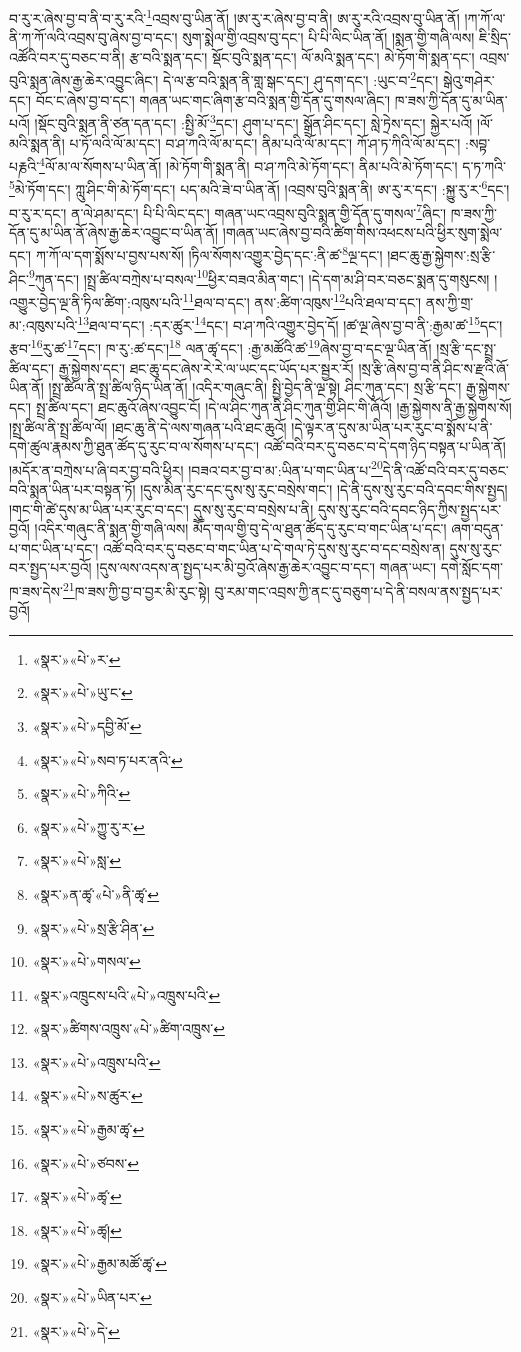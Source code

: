 བ་རུ་ར་ཞེས་བྱ་བ་ནི་བ་རུ་རའི་\footnote{«སྣར་»«པེ་»ར་}འབྲས་བུ་ཡིན་ནོ། །ཨ་རུ་ར་ཞེས་བྱ་བ་ནི། ཨ་རུ་རའི་འབྲས་བུ་ཡིན་ནོ། །ཀ་ཀོ་ལ་ནི་ཀ་ཀོ་ལའི་འབྲས་བུ་ཞེས་བྱ་བ་དང་། སུག་སྨེལ་གྱི་འབྲས་བུ་དང་། པི་པི་ལིང་ཡིན་ནོ། །སྨན་གྱི་གཞི་ལས། ཇི་སྲིད་འཚོའི་བར་དུ་བཅང་བ་ནི། རྩ་བའི་སྨན་དང་། སྡོང་བུའི་སྨན་དང་། ལོ་མའི་སྨན་དང་། མེ་ཏོག་གི་སྨན་དང་། འབྲས་བུའི་སྨན་ཞེས་རྒྱ་ཆེར་འབྱུང་ཞིང་། དེ་ལ་རྩ་བའི་སྨན་ནི་གླ་སྒང་དང་། ཤུ་དག་དང་། :ཡུང་བ་\footnote{«སྣར་»«པེ་»ཡུ་ང་}དང་། སྒེའུ་གཤེར་དང་། བོང་ང་ཞེས་བྱ་བ་དང་། གཞན་ཡང་གང་ཞིག་རྩ་བའི་སྨན་གྱི་དོན་དུ་གསལ་ཞིང་། ཁ་ཟས་ཀྱི་དོན་དུ་མ་ཡིན་པའོ། །སྡོང་བུའི་སྨན་ནི་ཙན་དན་དང་། :སྤྱི་མོ་\footnote{«སྣར་»«པེ་»དབྱི་མོ་}དང་། ཤུག་པ་དང་། སྒྲོན་ཤིང་དང་། སླེ་ཏྲེས་དང་། སྐྱེར་པའོ། །ལོ་མའི་སྨན་ནི། པ་ཏོ་ལའི་ལོ་མ་དང་། བ་ཤ་ཀའི་ལོ་མ་དང་། ནིམ་པའི་ལོ་མ་དང་། ཀོ་ཤ་ཏ་ཀིའི་ལོ་མ་དང་། :སབྟ་པརྞའི་\footnote{«སྣར་»«པེ་»སབ་ཏ་པར་ནའི་}ལོ་མ་ལ་སོགས་པ་ཡིན་ནོ། །མེ་ཏོག་གི་སྨན་ནི། བ་ཤ་ཀའི་མེ་ཏོག་དང་། ནིམ་པའི་མེ་ཏོག་དང་། ད་ཏ་ཀའི་\footnote{«སྣར་»«པེ་»ཀིའི་}མེ་ཏོག་དང་། ཀླུ་ཤིང་གི་མེ་ཏོག་དང་། པད་མའི་ཟེ་བ་ཡིན་ནོ། །འབྲས་བུའི་སྨན་ནི། ཨ་རུ་ར་དང་། :སྐྱུ་རུ་ར་\footnote{«སྣར་»«པེ་»ཀྱུ་རུ་ར་}དང་། བ་རུ་ར་དང་། ན་ལེ་ཤམ་དང་། པི་པི་ལིང་དང་། གཞན་ཡང་འབྲས་བུའི་སྨན་གྱི་དོན་དུ་གསལ་\footnote{«སྣར་»«པེ་»སླ་}ཞིང་། ཁ་ཟས་ཀྱི་དོན་དུ་མ་ཡིན་ནོ་ཞེས་རྒྱ་ཆེར་འབྱུང་བ་ཡིན་ནོ། །གཞན་ཡང་ཞེས་བྱ་བའི་ཚིག་གིས་འཕངས་པའི་ཕྱིར་སུག་སྨེལ་དང་། ཀ་ཀོ་ལ་དག་སྨོས་པ་བྱས་པས་སོ། །ཏིལ་སོགས་འགྱུར་བྱེད་དང་:ནི་ཚ་\footnote{«སྣར་»ན་ཚྭ་«པེ་»ནི་ཚྭ་}ལྔ་དང་། །ཐང་ཆུ་རྒྱ་སྐྱེགས་:སྲ་རྩི་ཤིང་\footnote{«སྣར་»«པེ་»སྲ་རྩི་ཤིན་}ཀུན་དང་། །སྤྲ་ཚིལ་བཀྲེས་པ་བསལ་\footnote{«སྣར་»«པེ་»གསལ་}ཕྱིར་བཟའ་མིན་གང་། །དེ་དག་མ་ཤི་བར་བཅང་སྨན་དུ་གསུངས། །འགྱུར་བྱེད་ལྔ་ནི་ཏིལ་ཚིག་:འཁུས་པའི་\footnote{«སྣར་»འཁྲུངས་པའི་«པེ་»འཁྲུས་པའི་}ཐལ་བ་དང་། ནས་:ཚིག་འཁུས་\footnote{«སྣར་»ཚིགས་འཁྲུས་«པེ་»ཚིག་འཁྲུས་}པའི་ཐལ་བ་དང་། ནས་ཀྱི་གྲ་མ་:འཁུས་པའི་\footnote{«སྣར་»«པེ་»འཁྲུས་པའི་}ཐལ་བ་དང་། :དར་ཚུར་\footnote{«སྣར་»«པེ་»ས་ཚུར་}དང་། བ་ཤ་ཀའི་འགྱུར་བྱེད་དོ། །ཚ་ལྔ་ཞེས་བྱ་བ་ནི་:རྒྱམ་ཚ་\footnote{«སྣར་»«པེ་»རྒྱམ་ཚྭ་}དང་། རྩབ་\footnote{«སྣར་»«པེ་»ཙབས་}རུ་ཚ་\footnote{«སྣར་»«པེ་»ཚྭ་}དང་། ཁ་རུ་:ཚ་དང་།\footnote{«སྣར་»«པེ་»ཚྭ།} ལན་ཚྭ་དང་། :རྒྱ་མཚོའི་ཚ་\footnote{«སྣར་»«པེ་»རྒྱམ་མཚོ་ཚྭ་}ཞེས་བྱ་བ་དང་ལྔ་ཡིན་ནོ། །སྲ་རྩི་དང་སྤྲ་ཚིལ་དང་། རྒྱ་སྐྱེགས་དང་། ཐང་ཆུ་དང་ཞེས་རེ་རེ་ལ་ཡང་དང་ཡོད་པར་སྦྱར་རོ། །སྲ་རྩི་ཞེས་བྱ་བ་ནི་ཤིང་ས་རྫའི་ཞོ་ཡིན་ནོ། །སྤྲ་ཚིལ་ནི་སྤྲ་ཚིལ་ཉིད་ཡིན་ནོ། །འདིར་གཞུང་ནི། སྤྱི་བྱེད་ནི་ལྔ་སྟེ། ཤིང་ཀུན་དང་། སྲ་རྩི་དང་། རྒྱ་སྐྱེགས་དང་། སྤྲ་ཚིལ་དང་། ཐང་ཆུའོ་ཞེས་འབྱུང་ངོ། །དེ་ལ་ཤིང་ཀུན་ནི་ཤིང་ཀུན་གྱི་ཤིང་གི་ཞོའོ། །རྒྱ་སྐྱེགས་ནི་རྒྱ་སྐྱེགས་སོ། །སྤྲ་ཚིལ་ནི་སྤྲ་ཚིལ་ལོ། །ཐང་ཆུ་ནི་དེ་ལས་གཞན་པའི་ཐང་ཆུའོ། །དེ་ལྟར་ན་དུས་མ་ཡིན་པར་རུང་བ་སྨོས་པ་ནི་དགེ་ཚུལ་རྣམས་ཀྱི་ཐུན་ཚོད་དུ་རུང་བ་ལ་སོགས་པ་དང་། འཚོ་བའི་བར་དུ་བཅང་བ་དེ་དག་ཉིད་བསྟན་པ་ཡིན་ནོ། །མདོར་ན་བཀྲེས་པ་ཞི་བར་བྱ་བའི་ཕྱིར། །བཟའ་བར་བྱ་བ་མ་:ཡིན་པ་གང་ཡིན་པ་\footnote{«སྣར་»«པེ་»ཡིན་པར་}དེ་ནི་འཚོ་བའི་བར་དུ་བཅང་བའི་སྨན་ཡིན་པར་བསྟན་ཏོ། །དུས་མིན་རུང་དང་དུས་སུ་རུང་བསྲེས་གང་། །དེ་ནི་དུས་སུ་རུང་བའི་དབང་གིས་སྤྱད། །གང་གི་ཚེ་དུས་མ་ཡིན་པར་རུང་བ་དང་། དུས་སུ་རུང་བ་བསྲེས་པ་ནི། དུས་སུ་རུང་བའི་དབང་ཉིད་ཀྱིས་སྤྱད་པར་བྱའོ། །འདིར་གཞུང་ནི་སྨན་གྱི་གཞི་ལས། མཽད་གལ་གྱི་བུ་དེ་ལ་ཐུན་ཚོད་དུ་རུང་བ་གང་ཡིན་པ་དང་། ཞག་བདུན་པ་གང་ཡིན་པ་དང་། འཚོ་བའི་བར་དུ་བཅང་བ་གང་ཡིན་པ་དེ་གལ་ཏེ་དུས་སུ་རུང་བ་དང་བསྲེས་ན། དུས་སུ་རུང་བར་སྤྱད་པར་བྱའོ། །དུས་ལས་འདས་ན་སྤྱད་པར་མི་བྱའོ་ཞེས་རྒྱ་ཆེར་འབྱུང་བ་དང་། གཞན་ཡང་། དགེ་སློང་དག་ཁ་ཟས་དེས་\footnote{«སྣར་»«པེ་»དེ་}ཁ་ཟས་ཀྱི་བྱ་བ་བྱར་མི་རུང་སྟེ། བུ་རམ་གང་འབྲས་ཀྱི་ནང་དུ་བཅུག་པ་དེ་ནི་བསལ་ནས་སྤྱད་པར་བྱའོ། 